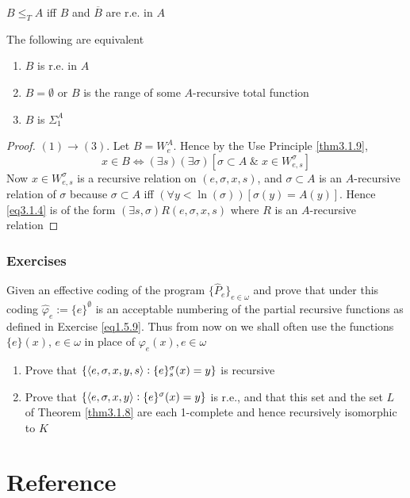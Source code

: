 \documentclass[11pt]{article}
\begin{document}
\begin{theorem}
\(B\le_T A\) iff \(B\) and \(\overbar{B}\) are r.e. in \(A\)
\end{theorem}

\begin{theorem}[]
The following are equivalent
\begin{enumerate}
\item \(B\) is r.e. in \(A\)
\item \(B=\emptyset\) or \(B\) is the range of some \(A\)-recursive total function
\item \(B\) is \(\Sigma_1^A\)
\end{enumerate}
\end{theorem}

\begin{proof}
\((1)\to(3)\). Let \(B=W_e^A\). Hence by the Use Principle \ref{thm3.1.9},
\begin{equation}
x\in B\Longleftrightarrow(\exists s)(\exists\sigma)[\sigma\subset A
\;\&\;x\in W_{e,s}^\sigma]\label{eq3.1.4}
\end{equation}
Now \(x\in W_{e,s}^\sigma\) is a recursive relation on \((e,\sigma,x,s)\), and
\(\sigma\subset A\) is an \(A\)-recursive relation of \(\sigma\) because
\(\sigma\subset A\) iff \((\forall y<\ln(\sigma))[\sigma(y)=A(y)]\).  Hence
\eqref{eq3.1.4} is of the form \((\exists s,\sigma)R(e,\sigma,x,s)\) where \(R\) is an
\(A\)-recursive relation
\end{proof}
\subsubsection{Exercises}
\label{sec:orgda8c072}
\begin{exercise}
\label{eq3.1.14}
Given an effective coding of the program \(\{\widehat{P}_e\}_{e\in\omega}\)
and prove that under this coding \(\widehat{\varphi}_e:=\{e\}^\emptyset\) is an
acceptable numbering of the partial recursive functions as defined in
Exercise \ref{eq1.5.9}. Thus from now on we shall often use the functions
\(\{e\}(x)\), \(e\in\omega\) in place of \(\varphi_e(x),e\in\omega\)
\end{exercise}

\begin{exercise}
\label{eq3.1.15}
\begin{enumerate}
\item Prove that \(\{\langle e,\sigma,x,y,s\rangle:\{e\}_s^\sigma(x)=y\}\) is recursive
\item Prove that \(\{\langle e,\sigma,x,y\rangle:\{e\}^\sigma(x)=y\}\) is r.e., and that this set
and the set \(L\) of Theorem \ref{thm3.1.8} are each 1-complete and hence
recursively isomorphic to \(K\)
\end{enumerate}
\end{exercise}
\section{Reference}
\label{sec:orgbb2aa81}


\end{document}
